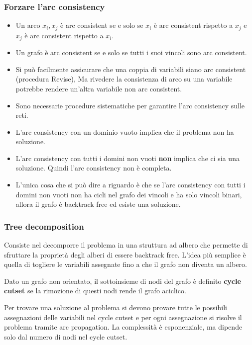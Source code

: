 \documentclass[a4paper]{article}
\begin{document}
\subsubsection{Forzare l'arc consistency}
\begin{definition}
  \begin{itemize}
    \item Un arco \( x_i, x_j \) è arc consistent se e solo se \( x_i \) è arc consistent
    rispetto a \( x_j \) e \( x_j \) è arc consistent rispetto a \( x_i \).
    
    \item 
    Un grafo è arc consistent se e solo se tutti i suoi vincoli sono arc consistent.

    \item 
    Si può facilmente assicurare che una coppia di variabili siano arc consistent
    (procedura Revise),
    Ma rivedere la consistenza di arco su una variabile potrebbe rendere un'altra
    variabile non arc consistent.

    \item 
    Sono necessarie procedure sistematiche per garantire l'arc consistency sulle reti.
  \end{itemize}
\end{definition}
\begin{itemize}
  \item L'arc consistency con un dominio vuoto implica che il problema non ha soluzione.

  \item 
    L'arc consistency con tutti i domini non vuoti \textbf{non} implica che ci sia una soluzione.
    Quindi l'arc consistency non è completa. 

  \item L'unica cosa che si può dire a riguardo è che
    se l'arc consistency con tutti i domini non vuoti non ha cicli nel grafo dei vincoli
    e ha solo vincoli binari, allora il grafo è backtrack free ed esiste una soluzione.
\end{itemize}

\subsubsection{Tree decomposition}
Consiste nel decomporre il problema in una struttura ad albero che permette di sfruttare
la proprietà degli alberi di essere backtrack free. L'idea più semplice è quella
di togliere le variabili assegnate fino a che il grafo non diventa un albero.
\begin{definition}
  Dato un grafo non orientato, il sottoinsieme di nodi del grafo è definito
  \textbf{cycle cutset} se la rimozione di questi nodi rende il grafo aciclico.
\end{definition}
Per trovare una soluzione al problema si devono provare tutte le possibili assegnazioni
delle variabili nel cycle cutset e per ogni assegnazione si risolve il problema tramite
arc propagation.
La complessità è esponenziale, ma dipende solo dal numero di nodi nel cycle cutset.
\end{document}
